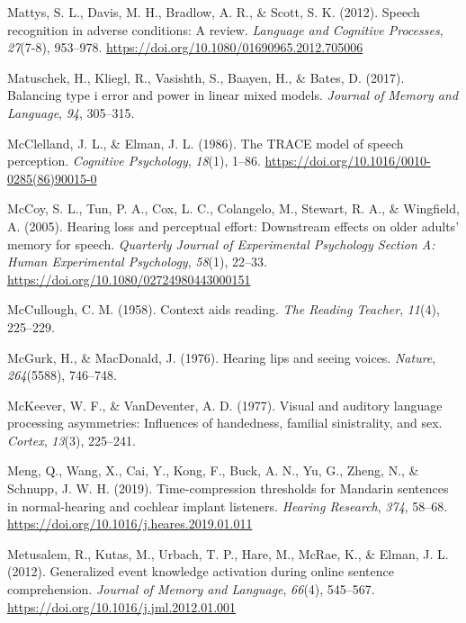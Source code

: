 \documentclass[a4paper, nobind]{templates/ociamthesis}
\newlength{\cslhangindent}
\newenvironment{CSLReferences}[2] %
 {%
  \setlength{\parindent}{0pt}
  \ifodd #1
  \let\oldpar\par
  \def\par{\hangindent=\cslhangindent\oldpar}
  \fi
  \setlength{\parskip}{1mm}
  \setlength{\baselineskip}{6mm}
 }%
 {}
\begin{document}
\begin{CSLReferences}{1}{0}
\leavevmode{}%
Mattys, S. L., Davis, M. H., Bradlow, A. R., \& Scott, S. K. (2012). {Speech recognition in adverse conditions: A review}. \emph{Language and Cognitive Processes}, \emph{27}(7-8), 953--978. \url{https://doi.org/10.1080/01690965.2012.705006}

\leavevmode{}%
Matuschek, H., Kliegl, R., Vasishth, S., Baayen, H., \& Bates, D. (2017). Balancing type i error and power in linear mixed models. \emph{Journal of Memory and Language}, \emph{94}, 305--315.

\leavevmode{}%
McClelland, J. L., \& Elman, J. L. (1986). {The TRACE model of speech perception}. \emph{Cognitive Psychology}, \emph{18}(1), 1--86. \url{https://doi.org/10.1016/0010-0285(86)90015-0}

\leavevmode{}%
McCoy, S. L., Tun, P. A., Cox, L. C., Colangelo, M., Stewart, R. A., \& Wingfield, A. (2005). {Hearing loss and perceptual effort: Downstream effects on older adults' memory for speech}. \emph{Quarterly Journal of Experimental Psychology Section A: Human Experimental Psychology}, \emph{58}(1), 22--33. \url{https://doi.org/10.1080/02724980443000151}

\leavevmode{}%
McCullough, C. M. (1958). {Context aids reading}. \emph{The Reading Teacher}, \emph{11}(4), 225--229.

\leavevmode{}%
McGurk, H., \& MacDonald, J. (1976). Hearing lips and seeing voices. \emph{Nature}, \emph{264}(5588), 746--748.

\leavevmode{}%
McKeever, W. F., \& VanDeventer, A. D. (1977). Visual and auditory language processing asymmetries: Influences of handedness, familial sinistrality, and sex. \emph{Cortex}, \emph{13}(3), 225--241.

\leavevmode{}%
Meng, Q., Wang, X., Cai, Y., Kong, F., Buck, A. N., Yu, G., Zheng, N., \& Schnupp, J. W. H. (2019). {Time-compression thresholds for Mandarin sentences in normal-hearing and cochlear implant listeners}. \emph{Hearing Research}, \emph{374}, 58--68. \url{https://doi.org/10.1016/j.heares.2019.01.011}

\leavevmode{}%
Metusalem, R., Kutas, M., Urbach, T. P., Hare, M., McRae, K., \& Elman, J. L. (2012). Generalized event knowledge activation during online sentence comprehension. \emph{Journal of Memory and Language}, \emph{66}(4), 545--567. \url{https://doi.org/10.1016/j.jml.2012.01.001}


\end{CSLReferences}
\end{document}
